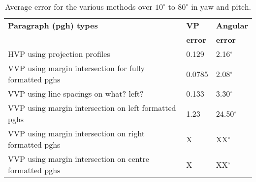 \begin{table}[t]
  \begin{center}
    \begin{tabular}{|p{95mm}|l|l|}
      \hline
      {\bf Paragraph (pgh) types } & {\bf VP} & {\bf Angular} \\
      {\bf } & {\bf error} & {\bf error} \\  \hline \hline
      HVP using projection profiles & 0.129 & 2.16$^\circ$ \\  \hline
      VVP using margin intersection for fully formatted pghs & 0.0785 & 2.08$^\circ$ \\ \hline
      VVP using line spacings on what? left? & 0.133 & 3.30$^\circ$ \\ \hline
      VVP using margin intersection on left formatted pghs & 1.23 & 24.50$^\circ$ \\   \hline
      VVP using margin intersection on right formatted pghs & X &  XX$^\circ$ \\ \hline
      VVP using margin intersection on centre formatted pghs & X  &  XX$^\circ$ \\ \hline  \hline
   \end{tabular}
  \end{center}
  \caption{Average error for the various methods over $10^\circ$ to $80^{\circ}$ in yaw and pitch.}
  \label{accuracytable}
\end{table}


